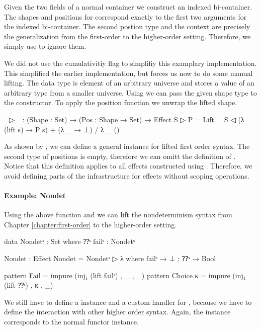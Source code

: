 Given the two fields of a normal container we construct an indexed bi-container.
The shapes and positions for  correspond exactly to the first
two arguments for the indexed bi-container.
The second postion type and the context are precisely the generalization from
the first-order to the higher-order setting.
Therefore, we simply use  to ignore them.

We did not use the cumulativitiy flag to simplifiy this examplary implementation.
This simplified the earlier implementation, but forces us now to do some manual
lifting.
The  data type is element of an arbitrary universe and stores
a value of an arbitrary type from a smaller universe.
Using  we can pass the given shape type to the constructor.
To apply the position function we unwrap the lifted shape.

\begin{code}
_▷_ : (Shape : Set) → (Pos : Shape → Set) → Effect
S ▷ P = Lift _ S ◁ (λ (lift s) → P s) + (λ _ → ⊥) / λ _ ()
\end{code}
As shown by \textcite{DBLP:conf/haskell/WuSH14}, we can define a general
 instance for lifted first order syntax.
The second type of positions is empty, therefore we can omitt the definition of
.
Notice that this definition applies to all effects constructed using
.
Therefore, we avoid defining parts of the infrastructure for effects without
scoping operations.


\paragraph{Example: Nondet}
Using the above function and  we can lift the
nondeterminism syntax from Chapter \ref{chapter:first-order} to the higher-order
setting.

\begin{code}[hide]
data Nondetˢ : Set where ⁇ˢ failˢ : Nondetˢ
\end{code}
\begin{code}
Nondet : Effect
Nondet = Nondetˢ ▷ λ where failˢ → ⊥ ; ⁇ˢ → Bool

pattern Fail      = impure (inj₁ (lift failˢ)  , _ , _)
pattern Choice κ  = impure (inj₁ (lift ⁇ˢ)     , κ , _)
\end{code}
We still have to define a  instance and a custom handler
for , because we have to define the interaction with other
higher order syntax.
Again, the  instance corresponds to the normal functor
instance.

